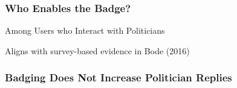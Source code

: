 \documentclass[xcolor=dvipsnames]{beamer}
\begin{document}
\begin{frame}
\frametitle{Who Enables the Badge?}
Among Users who Interact with Politicians

Aligns with survey-based evidence in Bode (2016)

\end{frame}



\begin{frame}
\frametitle{Badging Does Not Increase Politician Replies}

%
\begin{center}
\end{center}


\end{frame}
\end{document}
